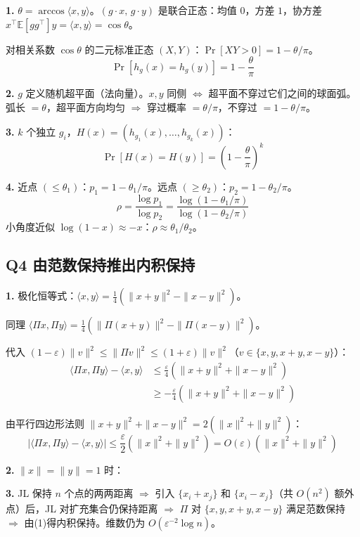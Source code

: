 \documentclass[11pt,a4paper]{ctexart}
\newcommand{\E}{\mathbb{E}}
\newcommand{\inner}[1]{\langle #1 \rangle}
\begin{document}
\textbf{1.} $\theta = \arccos\inner{x,y}$。$(g\cdot x,\, g\cdot y)$ 是联合正态：均值 $0$，方差 $1$，协方差 $x^\top \E[gg^\top]y = \inner{x,y} = \cos\theta$。

对相关系数 $\cos\theta$ 的二元标准正态 $(X,Y)$：$\Pr[XY>0] = 1 - \theta/\pi$。
\[
\boxed{\Pr[h_g(x)=h_g(y)] = 1 - \frac{\theta}{\pi}}
\]

\textbf{2.} $g$ 定义随机超平面（法向量）。$x,y$ 同侧 $\Leftrightarrow$ 超平面不穿过它们之间的球面弧。弧长 $=\theta$，超平面方向均匀 $\Rightarrow$ 穿过概率 $=\theta/\pi$，不穿过 $=1-\theta/\pi$。

\textbf{3.} $k$ 个独立 $g_i$，$H(x) = (h_{g_1}(x),\dots,h_{g_k}(x))$：
\[
\boxed{\Pr[H(x)=H(y)] = \left(1 - \frac{\theta}{\pi}\right)^k}
\]

\textbf{4.} 近点 $(\leq\theta_1)$：$p_1 = 1-\theta_1/\pi$。远点 $(\geq\theta_2)$：$p_2 = 1-\theta_2/\pi$。
\[
\boxed{\rho = \frac{\log p_1}{\log p_2} = \frac{\log(1-\theta_1/\pi)}{\log(1-\theta_2/\pi)}}
\]
小角度近似 $\log(1-x)\approx -x$：$\rho \approx \theta_1/\theta_2$。


\subsection*{Q4 \quad 由范数保持推出内积保持}

\textbf{1.} 极化恒等式：$\inner{x,y} = \frac{1}{4}(\|x+y\|^2 - \|x-y\|^2)$。

同理 $\inner{\Pi x,\Pi y} = \frac{1}{4}(\|\Pi(x+y)\|^2 - \|\Pi(x-y)\|^2)$。

代入 $(1-\varepsilon)\|v\|^2 \leq \|\Pi v\|^2 \leq (1+\varepsilon)\|v\|^2$（$v\in\{x,y,x+y,x-y\}$）：
\begin{align*}
\inner{\Pi x,\Pi y} - \inner{x,y}
&\leq \frac{\varepsilon}{4}(\|x+y\|^2 + \|x-y\|^2) \\
&\geq -\frac{\varepsilon}{4}(\|x+y\|^2 + \|x-y\|^2)
\end{align*}

由平行四边形法则 $\|x+y\|^2+\|x-y\|^2 = 2(\|x\|^2+\|y\|^2)$：
\[
\boxed{|\inner{\Pi x,\Pi y} - \inner{x,y}| \leq \frac{\varepsilon}{2}(\|x\|^2+\|y\|^2) = O(\varepsilon)(\|x\|^2+\|y\|^2)}
\]

\textbf{2.} $\|x\|=\|y\|=1$ 时：\boxed{$|\inner{\Pi x,\Pi y} - \inner{x,y}| \leq \varepsilon = O(\varepsilon)$}

\textbf{3.} JL 保持 $n$ 个点的两两距离 $\Rightarrow$ 引入 $\{x_i+x_j\}$ 和 $\{x_i-x_j\}$（共 $O(n^2)$ 额外点）后，JL 对扩充集合仍保持距离 $\Rightarrow$ $\Pi$ 对 $\{x,y,x+y,x-y\}$ 满足范数保持 $\Rightarrow$ 由(1)得内积保持。维数仍为 $O(\varepsilon^{-2}\log n)$。
\end{document}
